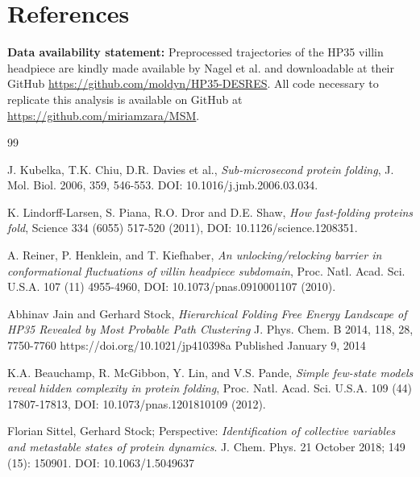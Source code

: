 \documentclass[prl,twocolumn]{revtex4-1}
\begin{document}
\section{References}
\textbf{Data availability statement:} Preprocessed trajectories of the HP35 villin headpiece are kindly made available by Nagel et al. and downloadable at their GitHub \url{https://github.com/moldyn/HP35-DESRES}.
All code necessary to replicate this analysis is available on GitHub at \url{https://github.com/miriamzara/MSM}.

\begin{thebibliography}{99}
\setlength{\itemsep}{3pt}  %


    J. Kubelka, T.K. Chiu, D.R. Davies et al.,
    \textit{Sub-microsecond protein folding},
    J. Mol. Biol. 2006, 359, 546-553.
    DOI: 10.1016/j.jmb.2006.03.034.

    K. Lindorff-Larsen, S. Piana, R.O. Dror and D.E. Shaw,  
    \textit{How fast-folding proteins fold}, 
    Science 334 (6055) 517-520 (2011), 
    DOI: 10.1126/science.1208351.

    A. Reiner, P. Henklein,  and T. Kiefhaber,   \textit{An unlocking/relocking barrier in conformational fluctuations of villin headpiece subdomain}, Proc. Natl. Acad. Sci. U.S.A. 107 (11) 4955-4960, DOI: 10.1073/pnas.0910001107 (2010).

    Abhinav Jain and Gerhard Stock,
    \textit{Hierarchical Folding Free Energy Landscape of HP35 Revealed by
    Most Probable Path Clustering}
    J. Phys. Chem. B 2014, 118, 28, 7750-7760
    https://doi.org/10.1021/jp410398a
    Published January 9, 2014

    K.A. Beauchamp, R. McGibbon, Y. Lin,  and V.S. Pande,   \textit{Simple few-state models reveal hidden complexity in protein folding}, Proc. Natl. Acad. Sci. U.S.A. 109 (44) 17807-17813, DOI: 10.1073/pnas.1201810109 (2012).

    Florian Sittel, Gerhard Stock; Perspective: \textit{Identification of collective variables and metastable states of protein dynamics}. J. Chem. Phys. 21 October 2018; 149 (15): 150901. DOI: 10.1063/1.5049637



\end{thebibliography}
\end{document}

